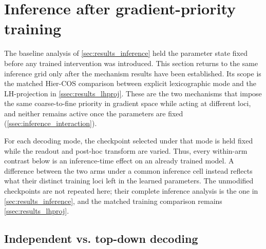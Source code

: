 
\section{Inference after gradient-priority training}
\label{sec:results_inference_priority}

The baseline analysis of \cref{sec:results_inference} held the parameter state
fixed before any trained intervention was introduced. This section returns to
the same inference grid only after the mechanism results have been established.
Its scope is the matched Hier-COS comparison between explicit lexicographic mode
and the LH-projection in \cref{ssec:results_lhproj}. These are the two mechanisms
that impose the same coarse-to-fine priority in gradient space while acting at
different loci, and neither remains active once the parameters are fixed
(\cref{ssec:inference_interaction}).

For each decoding mode, the checkpoint selected under that mode is held fixed
while the readout and post-hoc transform are varied. Thus, every within-arm
contrast below is an inference-time effect on an already trained model. A
difference between the two arms under a common inference cell instead reflects
what their distinct training loci left in the learned parameters. The unmodified
checkpoints are not repeated here; their complete inference analysis is the one
in \cref{sec:results_inference}, and the matched training comparison remains
\cref{ssec:results_lhproj}.

\subsection{Independent vs. top-down decoding}
\label{ssec:results_priority_decoder}

